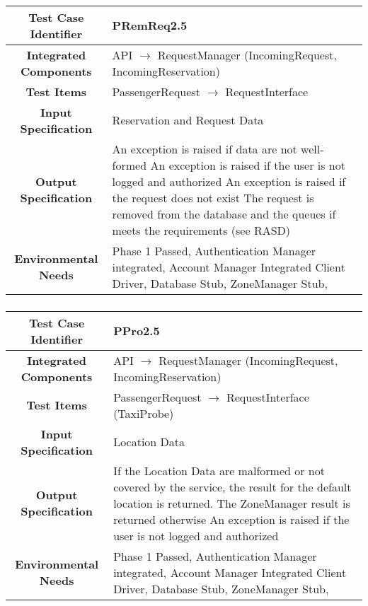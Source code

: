 \documentclass[11pt, a4paper,titlepage]{article}
\begin{document}
	 \subsubsection{}
	 \begin{tabularx}{\textwidth}{| c|X|}
	 	\hline \textbf{Test Case Identifier} & \label{PRemReq2.5}PRemReq2.5 \\
	 	\hline \textbf{Integrated Components} & API  $\rightarrow $ RequestManager (IncomingRequest, IncomingReservation) \\
	 	\hline \textbf{Test Items} & PassengerRequest $\rightarrow $ RequestInterface \\
	 	\hline \textbf{Input Specification} & Reservation and Request Data \\
	 	\hline \textbf{Output Specification} & An exception is raised if data are not well-formed \newline
	 	An exception is raised if the user is not logged and authorized \newline
	 	An exception is raised if the request does not exist \newline
	 	The request is removed from the database and the queues if meets the requirements (see RASD)\\
	 	\hline \textbf{Environmental Needs} &  Phase 1 Passed, Authentication Manager integrated, Account Manager Integrated \newline 
	 	Client Driver, Database Stub, ZoneManager Stub,\\
	 	\hline
	 \end{tabularx}
	 \newline
	 \subsubsection{}
	 \begin{tabularx}{\textwidth}{| c|X|}
	 	\hline \textbf{Test Case Identifier} & \label{PPro2.5}PPro2.5 \\
	 	\hline \textbf{Integrated Components} & API  $\rightarrow $ RequestManager (IncomingRequest, IncomingReservation) \\
	 	\hline \textbf{Test Items} & PassengerRequest $\rightarrow $ RequestInterface (TaxiProbe) \\
	 	\hline \textbf{Input Specification} & Location Data \\
	 	\hline \textbf{Output Specification} & If the Location Data are malformed or not covered by the service, the result for the default location is returned. The ZoneManager result is returned otherwise \newline
	 	An exception is raised if the user is not logged and authorized \\
	 	\hline \textbf{Environmental Needs} &  Phase 1 Passed, Authentication Manager integrated, Account Manager Integrated \newline 
	 	Client Driver, Database Stub, ZoneManager Stub,\\
	 	\hline
	 \end{tabularx}
	 \newline
	 \newpage
\end{document}
